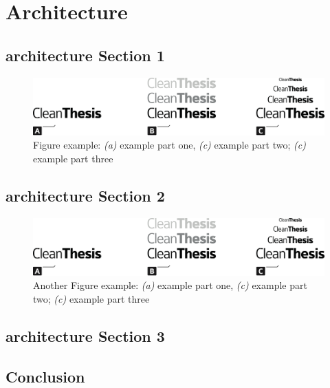 %
\chapter{Architecture}
\label{sec:architecture}


\Blindtext[2][1]

\section{architecture Section 1}
\label{sec:architecture:sec1}

\Blindtext[1][2]

\begin{figure}[htb]
	\includegraphics[width=\textwidth]{gfx/Clean-Thesis-Figure}
	\caption{Figure example: \textit{(a)} example part one, \textit{(c)} example part two; \textit{(c)} example part three}
	\label{fig:architecture:example1}
\end{figure}

\Blindtext[1][2]

\section{architecture Section 2}
\label{sec:architecture:sec2}

\Blindtext[1][2]

\begin{figure}[htb]
	\includegraphics[width=\textwidth]{gfx/Clean-Thesis-Figure}
	\caption{Another Figure example: \textit{(a)} example part one, \textit{(c)} example part two; \textit{(c)} example part three}
	\label{fig:architecture:example2}
\end{figure}

\Blindtext[2][2]

\section{architecture Section 3}
\label{sec:architecture:sec3}

\Blindtext[4][2]

\section{Conclusion}
\label{sec:architecture:conclusion}

\Blindtext[2][1]
